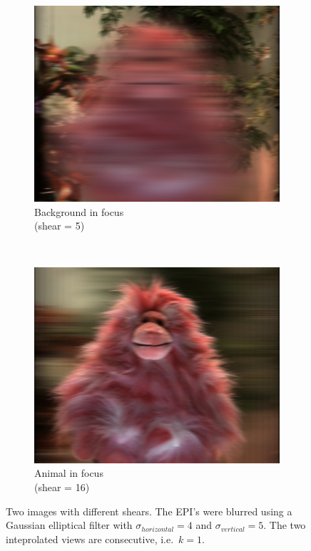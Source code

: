 \documentclass[a4paper]{article}
\begin{document}
\begin{figure}[ht]
	\begin{subfigure}[h]{0.48\textwidth}
	  \includegraphics[width=\textwidth]{shearedGauss_k1_shear5_sighor4_sigvert5}
	  \caption*{Background in focus \\(shear = 5)}
	\end{subfigure}
    	~
	\begin{subfigure}[h]{0.48\textwidth}
	  \includegraphics[width=\textwidth]{shearedGauss_k1_shear16_sighor4_sigvert5}
	  \caption*{Animal in focus \\(shear = 16)}
	\end{subfigure}
\caption{Two images with different shears. The EPI's were blurred using a Gaussian elliptical filter with $\sigma_{horizontal} = 4$ and $\sigma_{vertical} = 5$. The two inteprolated views are consecutive, i.e.\ $k=1$.}
\label{fig:shearedInterpolationGaussDifferentShear}
\end{figure}
\end{document}
